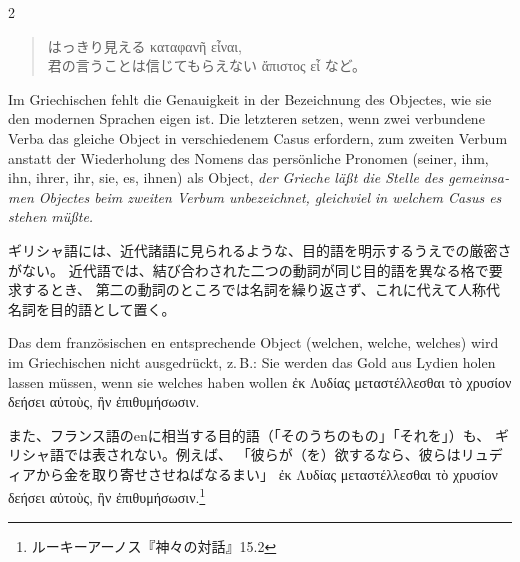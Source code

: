 \begin{paracol}{2}
\begin{enumerate}[leftmargin=0pt,rightmargin=0pt,listparindent =1cm,labelindent=1cm,labelsep=1ex,labelwidth={*},itemindent={*},align=left]
\begin{enumerate}
\begin{japanese}
 \begin{quote}
はっきり見える \textgreek[variant=ancient]{καταφανῆ εἶναι,}\\
君の言うことは信じてもらえない \textgreek[variant=ancient]{ἄπιστος εἶ}
など。
\end{quote}
\end{japanese}
\switchcolumn*


\end{enumerate}
\begin{german}
\item Im Griechischen fehlt die Genauigkeit in der Bezeichnung des Objectes,
wie sie den modernen Sprachen eigen ist. Die letzteren setzen, wenn
zwei verbundene Verba das gleiche Object in verschiedenem Casus erfordern,
zum zweiten Verbum anstatt der Wiederholung des Nomens das persönliche
Pronomen (seiner, ihm, ihn, ihrer, ihr, sie, es, ihnen) als Object,
\emph{der Grieche läßt die Stelle des gemeinsamen Objectes beim zweiten
Verbum unbezeichnet, gleichviel in welchem Casus es stehen müßte.}
\end{german}
\switchcolumn

\begin{japanese}
ギリシャ語には、近代諸語に見られるような、目的語を明示するうえでの厳密さがない。
近代語では、結び合わされた二つの動詞が同じ目的語を異なる格で要求するとき、
第二の動詞のところでは名詞を繰り返さず、これに代えて人称代名詞を目的語として置く。
\end{japanese}
\switchcolumn*

\begin{german}
Das dem französischen \textfrench{en} entsprechende Object (welchen,
welche, welches) wird im Griechischen nicht aus\textcompwordmark{}gedrückt,
z.\,B.: Sie werden das Gold aus Lydien holen lassen müssen, wenn
sie welches haben wollen \textgreek[variant=ancient]{ἐκ Λυδίας μεταστέλλεσθαι
τὸ χρυσίον δεήσει αὐτοὺς, ἢν ἐπιθυμήσωσιν.}
\end{german}
\switchcolumn

\begin{japanese}
また、フランス語の\textfrench{en}に相当する目的語（「そのうちのもの」「それを」）も、
ギリシャ語では表されない。例えば、
「彼らが（を）欲するなら、彼らはリュディアから金を取り寄せさせねばなるまい」
\textgreek[variant=ancient]{ἐκ Λυδίας μεταστέλλεσθαι τὸ χρυσίον δεήσει αὐτοὺς, ἢν ἐπιθυμήσωσιν.}\footnote{ルーキーアーノス『神々の対話』15.2}
\end{japanese}
\switchcolumn*


\end{enumerate}
\end{paracol}
